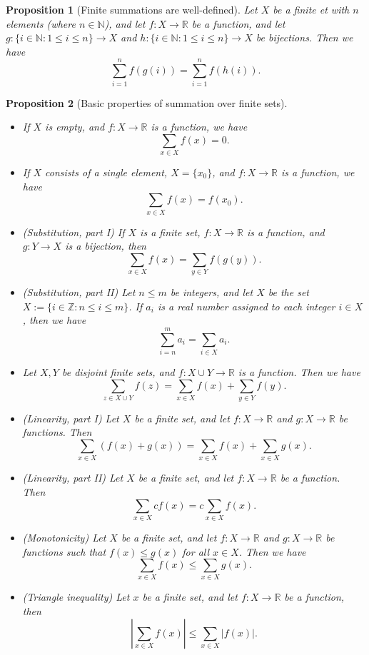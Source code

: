 \documentclass[
]{book}
\providecommand{\tightlist}{%
  \setlength{\itemsep}{0pt}\setlength{\parskip}{0pt}}
\newtheorem{proposition}{Proposition}[chapter]
\theoremstyle{definition}
\theoremstyle{definition}
\theoremstyle{definition}
\theoremstyle{definition}
\theoremstyle{remark}
\begin{document}
\begin{proposition}[Finite summations are well-defined]
Let \(X\) be a finite et with \(n\) elements (where \(n\in \mathbb{N}\)), and let \(f:X\to \mathbb{R}\) be a function, and let \(g:\{i\in\mathbb{N}:1\leq i\leq n\}\to X\) and \(h:\{i\in\mathbb{N}:1\leq i\leq n\}\to X\) be bijections. Then we have
\[
\sum_{i=1}^nf(g(i))=\sum_{i=1}^nf(h(i)).
\]
\end{proposition}

\begin{proposition}[Basic properties of summation over finite sets]
\protect\hypertarget{prp:bpf}{}\label{prp:bpf}\leavevmode

\begin{itemize}
\tightlist
\item
  If \(X\) is empty, and \(f:X\to \mathbb{R}\) is a function, we have
  \[
  \sum_{x\in X}f(x) = 0.
  \]
\item
  If \(X\) consists of a single element, \(X=\{x_0\}\), and \(f:X\to \mathbb{R}\) is a function, we have
  \[
  \sum_{x\in X}f(x) = f(x_0).
  \]
\item
  (Substitution, part I) If \(X\) is a finite set, \(f:X\to \mathbb{R}\) is a function, and \(g:Y\to X\) is a bijection, then
  \[
  \sum_{x\in X}f(x) = \sum_{y\in Y}f(g(y)).
  \]
\item
  (Substitution, part II) Let \(n\leq m\) be integers, and let \(X\) be the set \(X:=\{i\in\mathbb{Z}:n\leq i\leq m\}\). If \(a_i\) is a real number assigned to each integer \(i\in X\), then we have
  \[
  \sum_{i=n}^m a_i=\sum_{i\in X}a_i.
  \]
\item
  Let \(X,Y\) be disjoint finite sets, and \(f:X\cup Y\to \mathbb{R}\) is a function. Then we have
  \[
  \sum_{z\in X\cup Y}f(z)=\sum_{x\in X}f(x)+\sum_{y\in Y}f(y).
  \]
\item
  (Linearity, part I) Let \(X\) be a finite set, and let \(f:X\to \mathbb{R}\) and \(g:X\to \mathbb{R}\) be functions. Then
  \[
  \sum_{x\in X}(f(x)+g(x)) = \sum_{x\in X}f(x)+\sum_{x\in X}g(x).
  \]
\item
  (Linearity, part II) Let \(X\) be a finite set, and let \(f:X\to \mathbb{R}\) be a function. Then
  \[
  \sum_{x\in X}cf(x) = c\sum_{x\in X}f(x).
  \]
\item
  (Monotonicity) Let \(X\) be a finite set, and let \(f:X\to \mathbb{R}\) and \(g:X\to \mathbb{R}\) be functions such that \(f(x)\leq g(x)\) for all \(x\in X\). Then we have
  \[
  \sum_{x\in X}f(x)\leq\sum_{x\in X}g(x).
  \]
\item
  (Triangle inequality) Let \(x\) be a finite set, and let \(f:X\to \mathbb{R}\) be a function, then
  \[
  \left|\sum_{x\in X}f(x)\right|\leq\sum_{x\in X}|f(x)|.
  \]
\end{itemize}

\end{proposition}
\end{document}
